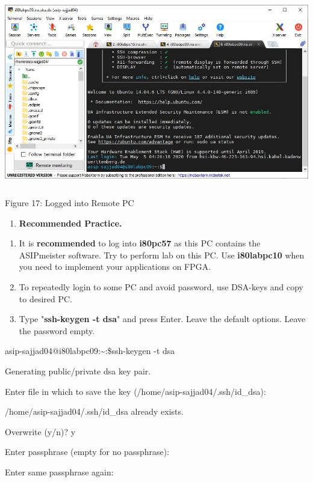 \documentclass{article}
\begin{document}
\includegraphics[width=5.70556in,height=3.27527in]{images/media/image17.JPG}

Figure 17: Logged into Remote PC

\begin{enumerate}
\def\labelenumi{\Alph{enumi}.}
\setcounter{enumi}{8}
\item
  \textbf{Recommended Practice.}
\end{enumerate}

\begin{enumerate}
\def\labelenumi{\arabic{enumi}.}
\setcounter{enumi}{7}
\item
  It is \textbf{recommended} to log into \textbf{i80pc57} as this PC
  contains the ASIPmeister software. Try to perform lab on this PC. Use
  \textbf{i80labpc10} when you need to implement your applications on
  FPGA.
\item
  To repeatedly login to some PC and avoid password, use DSA-keys and
  copy to desired PC.
\item
  Type "\textbf{ssh-keygen -t dsa}" and press Enter. Leave the default
  options. Leave the password empty.
\end{enumerate}

asip-sajjad04@i80labpc09:\textasciitilde:\$ssh-keygen -t dsa

Generating public/private dsa key pair.

Enter file in which to save the key (/home/asip-sajjad04/.ssh/id\_dsa):

/home/asip-sajjad04/.ssh/id\_dsa already exists.

Overwrite (y/n)? y

Enter passphrase (empty for no passphrase):

Enter same passphrase again:
\end{document}
